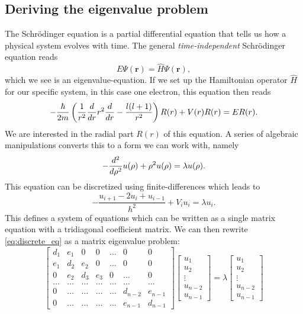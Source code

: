 \documentclass[a4paper, 10pt]{amsart}
\newcommand{\party}[1]{\frac{d}{d #1}}
\renewcommand{\v}[1]{\mathbf{#1}}
\begin{document}
\subsection{Deriving the eigenvalue problem}
\label{sub:deriving_the_eigenvalue_problem}

The Schr\"odinger equation is a partial differential equation that tells us how
a physical system evolves with time.  The general \emph{time-independent}
Schr\"odinger equation reads
\begin{equation}
  \label{eq:time_independent_eq}
  E\Psi(\v{r}) = \hat{H}\Psi(\v{r}),
\end{equation}
which we see is an eigenvalue-equation. If we set up the Hamiltonian operator
\( \hat{H} \) for our specific system, in this case one electron, this equation
then reads
\begin{equation}
  \notag
  - \frac{\hbar}{2m}\left( \frac{1}{r^2} \party{r} r^2 \party{r} - \frac{l(l+1)}{r^2}\right) R(r) + V(r)R(r) = ER(r).
\end{equation}
We are interested in the radial part \(R(r)\) of this equation.  A series of
algebraic manipulations converts this to a form we can work with, namely
\begin{equation}
  \notag
  - \frac{d^2}{d\rho^2}u(\rho) + \rho^2 u(\rho) = \lambda u(\rho).
\end{equation}
This equation can be discretized using finite-differences which leads to
\begin{equation}
  \label{eq:discrete_eq}
  -\frac{u_{i+1} - 2u_{i} + u_{i-1}}{h^2} + V_i u_i = \lambda u_i.
\end{equation}
This defines a system of equations which can be written as a single matrix
equation with a tridiagonal coefficient matrix. We can then rewrite
\cref{eq:discrete_eq} as a matrix eigenvalue problem:
\begin{equation}
  \begin{bmatrix}
    d_1 & e_1 & 0 & 0 & \ldots & 0 & 0 \\
    e_1 & d_2 & e_2 & 0 & \ldots & 0 & 0 \\
    0 & e_2 & d_3 & e_3 & 0 & \ldots & 0 \\
    \ldots & \ldots & \ldots & \ldots & \ldots & \ldots & \ldots \\
    0 & \ldots & \ldots & \ldots & \ldots & d_{n-2} & e_{n-1} \\
    0 & \ldots & \ldots & \ldots & \ldots & e_{n-1} & d_{n-1}
  \end{bmatrix}
  \begin{bmatrix}
    u_1 \\
    u_2 \\
    \vdots \\
    u_{n-2} \\
    u_{n-1}
  \end{bmatrix}
  = \lambda
  \begin{bmatrix}
    u_1 \\
    u_2 \\
    \vdots \\
    u_{n-2} \\
    u_{n-1}
  \end{bmatrix}
\end{equation}
\end{document}
